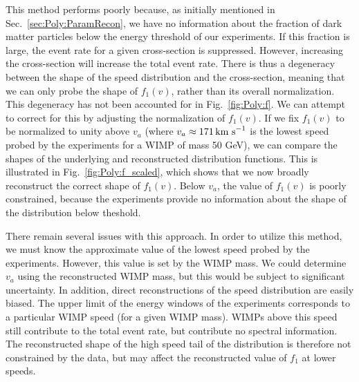 This method performs poorly because, as initially mentioned in Sec.~\ref{sec:Poly:ParamRecon}, we have no information about the fraction of dark matter particles below the energy threshold of our experiments. If this fraction is large, the event rate for a given cross-section is suppressed. However, increasing the cross-section will increase the total event rate. There is thus a degeneracy between the shape of the speed distribution and the cross-section, meaning that we can only probe the shape of $f_1(v)$, rather than its overall normalization. This degeneracy has not been accounted for in Fig.~\ref{fig:Poly:f}. We can attempt to correct for this by adjusting the normalization of $f_1(v)$. If we fix $f_1(v)$ to be normalized to unity above $v_a$ (where $v_a \approx 171 \,\textrm{km s}^{-1}$ is the lowest speed probed by the experiments for a WIMP of mass 50 GeV), we can compare the shapes of the underlying and reconstructed distribution functions. This is illustrated in Fig.~\ref{fig:Poly:f_scaled}, which shows that we now broadly reconstruct the correct shape of $f_1(v)$. Below $v_a$, the value of $f_1(v)$ is poorly constrained, because the experiments provide no information about the shape of the distribution below theshold.

There remain several issues with this approach. In order to utilize this method, we must know the approximate value of the lowest speed probed by the experiments. However, this value is set by the WIMP mass. We could determine $v_a$ using the reconstructed WIMP mass, but this would be subject to significant uncertainty. In addition, direct reconstructions of the speed distribution are easily biased. The upper limit of the energy windows of the experiments corresponds to a particular WIMP speed (for a given WIMP mass). WIMPs above this speed still contribute to the total event rate, but contribute no spectral information. The reconstructed shape of the high speed tail of the distribution is therefore not constrained by the data, but may affect the reconstructed value of $f_1$ at lower speeds.


